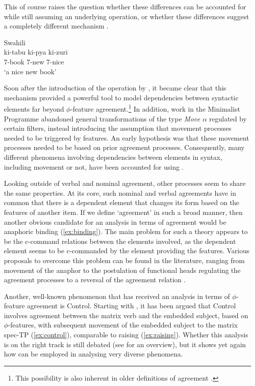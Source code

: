 \documentclass[output=paper
,modfonts
,nonflat]{langsci/langscibook}
\begin{document}
This of course raises the question whether these differences can be accounted for while still assuming an underlying \agr{} operation, or whether these differences suggest a completely different mechanism \citep{Norris2014}.

\begin{exe}
	\ex Swahili \label{ex:swa-concorde}\\
	\gll ki-tabu ki-pya ki-zuri\\
	7-book 7-new 7-nice\\
	\glt `a nice new book'
\end{exe}
Soon after the introduction of the {\agr} operation by \citet{Chomsky2000,Chomsky2001}, it became clear that this mechanism provided a powerful tool to model dependencies between syntactic elements far beyond $\phi$-feature agreement.\footnote{This possibility is also inherent in older definitions of agreement \citep{steel1978,kayne1989}.}
In addition, work in the Minimalist Programme abandoned general transformations of the type \textit{Move $\alpha$} regulated by certain filters, instead introducing the assumption that movement processes needed to be triggered by features.
An early hypothesis was that these  movement processes needed to be based on prior agreement processes.
Consequently, many different phenomena involving dependencies between elements in syntax, including movement or not, have been accounted for using \agr.

Looking outside of verbal and nominal agreement, other processes seem to share the same properties.
At its core, such nominal and verbal agreements have in common that there is a dependent element that changes its form based on the features of another item.
If we define `agreement' in such a broad manner, then another obvious candidate for an analysis in terms of agreement would be anaphoric binding (\ref{ex:binding}). The main problem for such a theory appears to be the c-command relations between the elements involved, as the dependent element seems to be c-commanded by the element providing the features. Various proposals to overcome this problem can be found in the literature, ranging from movement of the anaphor \citep{rooryckvandenwyngaerd} to the postulation of functional heads regulating the agreement processes \citep{reuland2001,reuland2011} to a reversal of the agreement relation \citep{bjorkmanzeijlstra}.

Another, well-known phenomenon that has received an analysis in terms of $\phi$-feature agreement is Control. Starting with \citet{hornstein1999}, it has been argued that Control involves agreement between the matrix verb and the embedded subject, based on $\phi$-fea\-tures, with subsequent movement of the embedded subject to the matrix spec-TP (\ref{ex:control}), comparable to raising (\ref{ex:raising}). Whether this analysis is on the right track is still debated (see \citealt{landau2013} for an overview), but it shows yet again how {\agr} can be employed in analysing very diverse phenomena.
\end{document}
